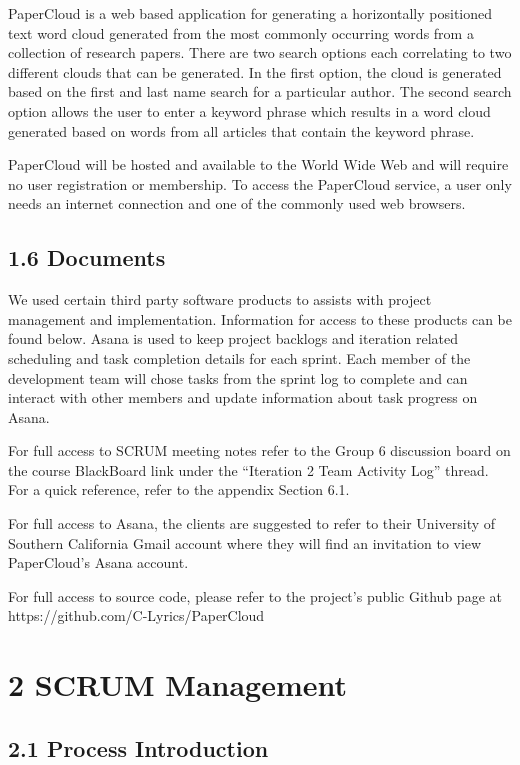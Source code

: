 \documentclass[]{article}
\begin{document}
PaperCloud is a web based application for generating a horizontally
positioned text word cloud generated from the most commonly occurring
words from a collection of research papers. There are two search options
each correlating to two different clouds that can be generated. In the
first option, the cloud is generated based on the first and last name
search for a particular author. The second search option allows the user
to enter a keyword phrase which results in a word cloud generated based
on words from all articles that contain the keyword phrase.

PaperCloud will be hosted and available to the World Wide Web and will
require no user registration or membership. To access the PaperCloud
service, a user only needs an internet connection and one of the
commonly used web browsers.

\subsection{1.6 Documents}\label{documents}

We used certain third party software products to assists with project
management and implementation. Information for access to these products
can be found below. Asana is used to keep project backlogs and iteration
related scheduling and task completion details for each sprint. Each
member of the development team will chose tasks from the sprint log to
complete and can interact with other members and update information
about task progress on Asana.

For full access to SCRUM meeting notes refer to the Group 6 discussion
board on the course BlackBoard link under the ``Iteration 2 Team
Activity Log'' thread. For a quick reference, refer to the appendix
Section 6.1.

For full access to Asana, the clients are suggested to refer to their
University of Southern California Gmail account where they will find an
invitation to view PaperCloud's Asana account.

For full access to source code, please refer to the project's public
Github page at https://github.com/C-Lyrics/PaperCloud

\section{2 SCRUM Management}\label{scrum-management}

\subsection{2.1 Process Introduction}\label{process-introduction}
\end{document}
